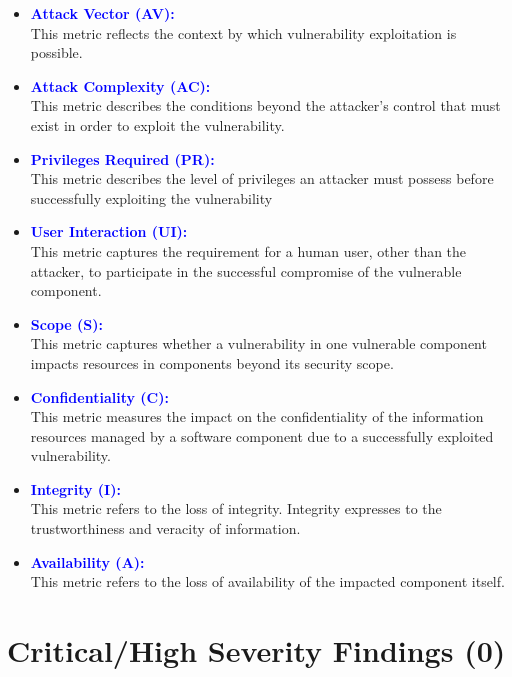 \documentclass{article}
\begin{document}
\begin{itemize}
	\item \textbf{\textcolor{blue}{Attack Vector (AV):}} \\ This metric reflects the context by which vulnerability exploitation is possible.
	\item \textbf{\textcolor{blue}{Attack Complexity (AC):}} \\ This metric describes the conditions beyond the attacker's control that must exist in order to exploit the vulnerability.
	\item \textbf{\textcolor{blue}{Privileges Required (PR):}} \\ This metric describes the level of privileges an attacker must possess before successfully exploiting the vulnerability
	\item \textbf{\textcolor{blue}{User Interaction (UI):}} \\ This metric captures the requirement for a human user, other than the attacker, to participate in the successful compromise of the vulnerable component.
	\item \textbf{\textcolor{blue}{Scope (S):}} \\ This metric captures whether a vulnerability in one vulnerable component impacts resources in components beyond its security scope.
	\item \textbf{\textcolor{blue}{Confidentiality (C):}} \\ This metric measures the impact on the confidentiality of the information resources managed by a software component due to a successfully exploited vulnerability.
	\item \textbf{\textcolor{blue}{Integrity (I):}} \\ This metric refers to the loss of integrity. Integrity expresses to the trustworthiness and veracity of information.
	\item \textbf{\textcolor{blue}{Availability (A):}} \\ This metric refers to the loss of availability of the impacted component itself.
\end{itemize}
\newpage
\section{Critical/High Severity Findings (0)}

\newpage
\end{document}
